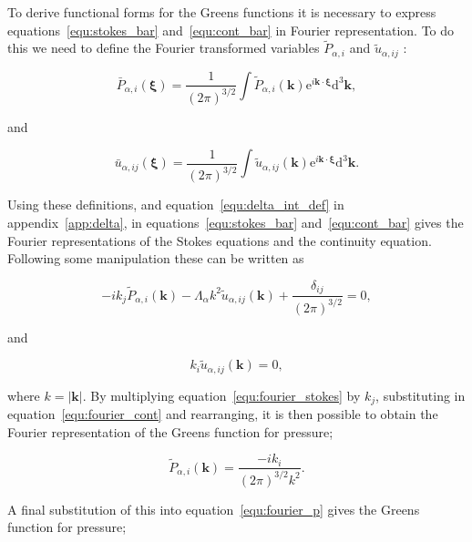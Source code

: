 \documentclass[12pt]{article}
\begin{document}
To derive functional forms for the Greens functions it is necessary to express equations~\ref{equ:stokes_bar} and~\ref{equ:cont_bar} in Fourier representation. To do this we need to define the Fourier transformed variables $\tilde{P}_{\alpha, i}$ and $\tilde{u}_{\alpha,ij}$ \cite{Riley06}:

\begin{equation}
\label{equ:fourier_p}
\bar{P}_{\alpha, i} (\boldsymbol\xi) = \frac{1}{(2 \pi)^{3/2}} \int \tilde{P}_{\alpha, i} (\boldsymbol{k}) \mathrm{e}^{i \boldsymbol{k} \cdot \boldsymbol\xi} \mathrm{d}^{3} \boldsymbol{k} ,
\end{equation}

and 

\begin{equation}
\label{equ:fourier_vel}
\bar{u}_{\alpha,ij} (\boldsymbol\xi) = \frac{1}{(2 \pi)^{3/2}} \int \tilde{u}_{\alpha,ij} (\boldsymbol{k}) \mathrm{e}^{i \boldsymbol{k} \cdot \boldsymbol\xi} \mathrm{d}^{3} \boldsymbol{k} .
\end{equation}


Using these definitions, and equation~\ref{equ:delta_int_def} in appendix~\ref{app:delta}, in equations~\ref{equ:stokes_bar} and~\ref{equ:cont_bar} gives the Fourier representations of the Stokes equations and the continuity equation. Following some manipulation these can be written as

\begin{equation}
\label{equ:fourier_stokes}
-i k_{j} \tilde{P}_{\alpha, i} (\boldsymbol{k}) - \Lambda_{\alpha} k^{2} \tilde{u}_{\alpha,ij} (\boldsymbol{k}) + \frac{\delta_{ij}}{(2 \pi)^{3/2}} = 0 ,
\end{equation}

and 

\begin{equation}
\label{equ:fourier_cont}
k_{i} \tilde{u}_{\alpha,ij} (\boldsymbol{k}) = 0 ,
\end{equation}

where $k = |\boldsymbol{k}|$. By multiplying equation~\ref{equ:fourier_stokes} by $k_{j}$, substituting in equation~\ref{equ:fourier_cont} and rearranging, it is then possible to obtain the Fourier representation of the Greens function for pressure;

\begin{equation}
\label{equ:fourier_green_p}
\tilde{P}_{\alpha, i} (\boldsymbol{k}) = \frac{-i k_{i}}{(2 \pi)^{3/2} k^{2}}.
\end{equation}

A final substitution of this into equation~\ref{equ:fourier_p} gives the Greens function for pressure;
\end{document}
